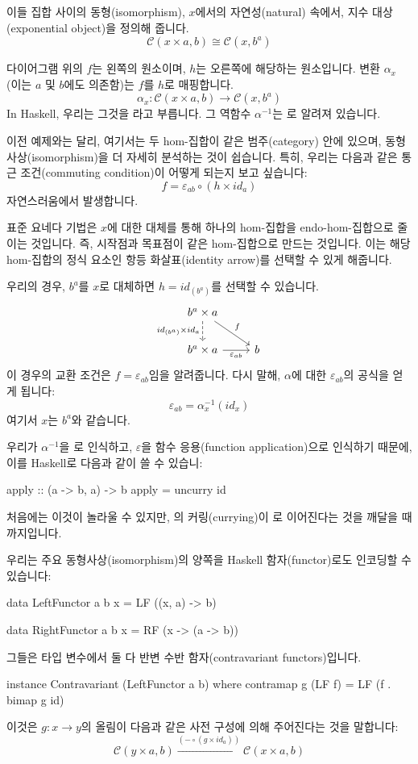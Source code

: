 \documentclass[DaoFP]{subfiles}
\begin{document}
이들 집합 사이의 동형(isomorphism), $x$에서의 자연성(natural) 속에서, 지수 대상(exponential object)을 정의해 줍니다.
\[\mathcal{C}(x \times a, b) \cong \mathcal{C}(x, b^a)\]

다이어그램 위의 $f$는 왼쪽의 원소이며, $h$는 오른쪽에 해당하는 원소입니다. 변환 $\alpha_x$ (이는 $a$ 및 $b$에도 의존함)는 $f$를 $h$로 매핑합니다.
\[ \alpha_x \colon \mathcal{C}(x \times a, b) \to \mathcal{C}(x, b^a) \]
In Haskell, 우리는 그것을 라고 부릅니다. 그 역함수 $\alpha^{-1}$는 로 알려져 있습니다.

이전 예제와는 달리, 여기서는 두 hom-집합이 같은 범주(category) 안에 있으며, 동형사상(isomorphism)을 더 자세히 분석하는 것이 쉽습니다. 특히, 우리는 다음과 같은 통근 조건(commuting condition)이 어떻게 되는지 보고 싶습니다:
\[  f = \varepsilon_{a b} \circ (h \times id_a) \]
자연스러움에서 발생합니다.

표준 요네다 기법은 $x$에 대한 대체를 통해 하나의 hom-집합을 endo-hom-집합으로 줄이는 것입니다. 즉, 시작점과 목표점이 같은 hom-집합으로 만드는 것입니다. 이는 해당 hom-집합의 정식 요소인 항등 화살표(identity arrow)를 선택할 수 있게 해줍니다.

우리의 경우, $b^a$를 $x$로 대체하면 $h = id_{(b^a)}$를 선택할 수 있습니다.
\[
 \begin{tikzcd}
 b^a \times a
 \arrow[d, dashed, "id_{(b^a)} \times id_a"']
 \arrow[rd, "f"]
 \\
 b^a \times a
 \arrow[r, "\varepsilon_{a b}"']
& b
 \end{tikzcd}
\]
이 경우의 교환 조건은 $f = \varepsilon_{a b}$임을 알려줍니다. 다시 말해, $\alpha$에 대한 $\varepsilon_{a b}$의 공식을 얻게 됩니다:
\[ \varepsilon_{a b} = \alpha_{x}^{-1} (id_{x}) \]
여기서 $x$는 $b^a$와 같습니다.

우리가 $\alpha^{-1}$을 로 인식하고, $\varepsilon$을 함수 응용(function application)으로 인식하기 때문에, 이를 Haskell로 다음과 같이 쓸 수 있습니:
\begin{haskell}
apply :: (a -> b, a) -> b
apply = uncurry id
\end{haskell}
처음에는 이것이 놀라울 수 있지만, 의 커링(currying)이 로 이어진다는 것을 깨달을 때까지입니다.

우리는 주요 동형사상(isomorphism)의 양쪽을 Haskell 함자(functor)로도 인코딩할 수 있습니다:
\begin{haskell}
data LeftFunctor  a b x = LF ((x, a) -> b)
\end{haskell}
\begin{haskell}
data RightFunctor a b x = RF (x -> (a -> b))
\end{haskell}
그들은  타입 변수에서 둘 다 반변 수반 함자(contravariant functors)입니다.
\begin{haskell}
instance Contravariant (LeftFunctor a b) where
  contramap g (LF f) = LF (f . bimap g id)
\end{haskell}
이것은 $g \colon x \to y$의 올림이 다음과 같은 사전 구성에 의해 주어진다는 것을 말합니다:
\[ \mathcal{C}(y \times a, b) \xrightarrow{(- \circ (g \times id_a)) }  \mathcal{C}(x \times a, b)\]
\end{document}

